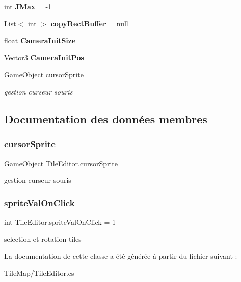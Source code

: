 \begin{DoxyCompactItemize}
\mbox{\label{class_tile_editor_a6d4a70954ddad9468e0fb4824587960c}} 
int {\bfseries J\+Max} = -\/1
\item 
\mbox{\label{class_tile_editor_ab880b414b6ae4a4eec0a74a8464fd74f}} 
List$<$ int $>$ {\bfseries copy\+Rect\+Buffer} = null
\item 
\mbox{\label{class_tile_editor_aa67963a2d122ecdd3ecb591dd28c8856}} 
float {\bfseries Camera\+Init\+Size}
\item 
\mbox{\label{class_tile_editor_a29e537a4bffe84702bb7ba5c6788f890}} 
Vector3 {\bfseries Camera\+Init\+Pos}
\item 
Game\+Object \hyperlink{class_tile_editor_a7419b8c1c2c27a10a82767f7667f3d8b}{cursor\+Sprite}
\begin{DoxyCompactList}\small\item\em gestion curseur souris \end{DoxyCompactList}\end{DoxyCompactItemize}


\subsection{Documentation des données membres}
\mbox{\label{class_tile_editor_a7419b8c1c2c27a10a82767f7667f3d8b}} 
\subsubsection{\texorpdfstring{cursor\+Sprite}{cursorSprite}}
{\footnotesize\ttfamily Game\+Object Tile\+Editor.\+cursor\+Sprite\hspace{0.3cm}{\ttfamily [protected]}}



gestion curseur souris 

\mbox{\label{class_tile_editor_a6b7e8a9c28da445fcc357c5814ec2c7e}} 
\subsubsection{\texorpdfstring{sprite\+Val\+On\+Click}{spriteValOnClick}}
{\footnotesize\ttfamily int Tile\+Editor.\+sprite\+Val\+On\+Click = 1\hspace{0.3cm}{\ttfamily [protected]}}



selection et rotation tiles 



La documentation de cette classe a été générée à partir du fichier suivant \+:\begin{DoxyCompactItemize}
\item 
Tile\+Map/Tile\+Editor.\+cs\end{DoxyCompactItemize}
